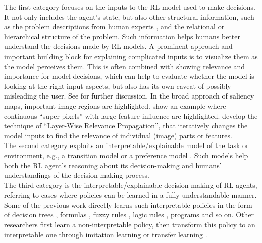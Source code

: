 \documentclass[twoside,11pt]{article}
\begin{document}
The first category focuses on the inputs to the RL model used to make decisions. It not only includes the agent's state, but also other structural information, such as the problem descriptions from human experts \citep{hasanbeig2021deepsynth}, and the relational \citep{battaglia2018relational,martinez2017relational} or hierarchical structure \citep{andreas2017modular,lyu2019sdrl} of the problem. Such information helps humans better understand the decisions made by RL models. 
A prominent approach and important building block for explaining complicated inputs is to visualize them as the model perceives them. This is often combined with showing relevance and importance for model decisions, which can help to evaluate whether the model is looking at the right input aspects, but also has its own caveat of possibly misleading the user. See \citet{EvansEtAl:2021:ExplainabilityParadox} for further discussion.
In the broad approach of saliency maps, important image regions are highlighted. \citet{LiuEtAl:2018:LinearModelUTrees} show an example where continuous ``super-pixels'' with large feature influence are highlighted. \citet{Bach:2015:LayerWiseRelevancePropagation} develop the technique of ``Layer-Wise Relevance Propagation'', that iteratively changes the model inputs to find the relevance of individual (image) parts or features. \\

The second category exploits an interpretable/explainable model of the task or environment, e.g., a transition model \citep{martinez2016learning,zhu2020object} or a preference model \citep{icarte2018using,toro2019learning}. Such models help both the RL agent's reasoning about its decision-making and humans' understandings of the decision-making process. \\

The third category is the interpretable/explainable decision-making of RL agents, referring to cases where policies can be learned in a fully understandable manner. Some of the previous work directly learns such interpretable policies in the form of decision trees \citep{likmeta2020combining,silva2020optimization,topin2021iterative}, formulas \citep{hein2018interpretable,hein2019generating}, fuzzy rules \citep{akrour2019towards,hein2017particle,zhang2021kogun}, logic rules \citep{jiang2019neural}, programs \citep{sun2019program,verma2019imitation} and so on. Other researchers first learn a non-interpretable policy, then transform this policy to an interpretable one through imitation learning or transfer learning \citep{bastani2018verifiable,VermaEtAl:2018:ProgrammaticallyInterpretableRL}.
\end{document}
